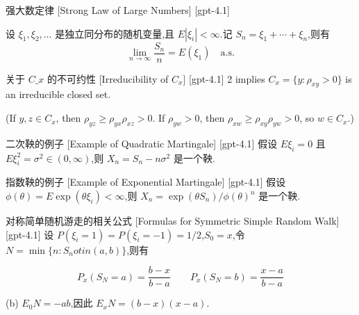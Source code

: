 \documentclass[UTF8]{ctexart}
\begin{document}
    
    
    \begin{thm}
        {强大数定律}
        [Strong Law of Large Numbers]
        [gpt-4.1]
        
设 $\xi_1, \xi_2, \ldots$ 是独立同分布的随机变量,且 $E|\xi_i| < \infty$.记 $S_n = \xi_1 + \cdots + \xi_n$,则有
\[
\operatorname* { lim } _ { n \to \infty } \frac{S_n}{n} = E(\xi_1) \quad \mathrm{a.s.}
\]

    \end{thm}
    
    
    
    \begin{thm}
        [Irreducibility-of-$C-x$]
        {关于 $C\_x$ 的不可约性}
        [Irreducibility of $C_x$]
        [gpt-4.1]
        2 implies $C_x = \{ y : \rho_{xy} > 0 \}$ is an irreducible closed set.

(If $y, z \in C_x$, then $\rho_{yz} \geq \rho_{yx} \rho_{xz} > 0$.
If $\rho_{yw} > 0$, then $\rho_{xw} \geq \rho_{xy} \rho_{yw} > 0$, so $w \in C_x$.)
    \end{thm}
    
    
    
    \begin{xmp}
        {二次鞅的例子}
        [Example of Quadratic Martingale]
        [gpt-4.1]
        假设 $E \xi_{i} = 0$ 且 $E \xi_{i}^{2} = \sigma^{2} \in (0, \infty)$,则 $X_{n} = S_{n} - n \sigma^{2}$ 是一个鞅.
    \end{xmp}
    
    
    
    \begin{xmp}
        {指数鞅的例子}
        [Example of Exponential Martingale]
        [gpt-4.1]
        假设 $\phi(\theta) = E \exp(\theta \xi_{i}) < \infty$,则 $X_{n} = \exp(\theta S_{n}) / \phi(\theta)^{n}$ 是一个鞅.
    \end{xmp}
    
    
    
    \begin{thm}
        {对称简单随机游走的相关公式}
        [Formulas for Symmetric Simple Random Walk]
        [gpt-4.1]
        设 $P(\xi_{i} = 1) = P(\xi_{i} = -1) = 1/2$,$S_{0} = x$,令 $N = \operatorname*{min} \{ n : S_{n} 
otin (a, b) \}$,则有

\[
P_{x}(S_{N} = a) = \frac{b - x}{b - a} \qquad P_{x}(S_{N} = b) = \frac{x - a}{b - a}
\]

(b) $E_{0} N = -ab$,因此 $E_{x} N = (b - x)(x - a)$.
    \end{thm}
    
\end{document}
